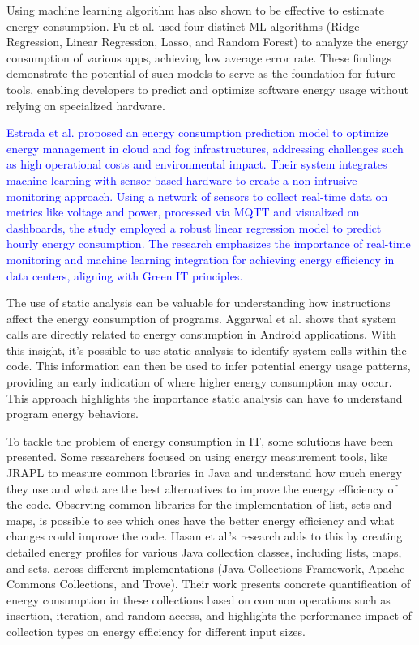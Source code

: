 \documentclass[sigplan]{acmart}
\newcommand{\wnote}[1]{\textcolor{blue}{#1}}
\begin{document}
Using machine learning algorithm has also shown to be effective to estimate energy consumption. Fu et al. \cite{8726531} used four distinct ML algorithms (Ridge Regression, Linear Regression, Lasso, and Random Forest) to analyze the energy consumption of various apps, achieving low average error rate. These findings demonstrate the potential of such models to serve as the foundation for future tools, enabling developers to predict and optimize software energy usage without relying on specialized hardware.

\wnote{Estrada et al. \cite{estrada2022learning} proposed an energy consumption prediction model to optimize energy management in cloud and fog infrastructures, addressing challenges such as high operational costs and environmental impact. Their system integrates machine learning with sensor-based hardware to create a non-intrusive monitoring approach. Using a network of sensors to collect real-time data on metrics like voltage and power, processed via MQTT and visualized on dashboards, the study employed a robust linear regression model to predict hourly energy consumption. The research emphasizes the importance of real-time monitoring and machine learning integration for achieving energy efficiency in data centers, aligning with Green IT principles.}

The use of static analysis can be valuable for understanding how instructions affect the energy consumption of programs. Aggarwal et al. \cite{aggarwal2014power} shows that system calls are directly related to energy consumption in Android applications. With this insight, it's possible to use static analysis to identify system calls within the code. This information can then be used to infer potential energy usage patterns, providing an early indication of where higher energy consumption may occur. This approach highlights the importance static analysis can have to understand program energy behaviors.

To tackle the problem of energy consumption in IT, some solutions have been presented. Some researchers focused on using energy measurement tools, like JRAPL to measure common libraries in Java and understand how much energy they use and what are the best alternatives to improve the energy efficiency of the code\cite{10.1145/2896967.2896968}. Observing common libraries for the implementation of list, sets and maps, is possible to see which ones have the better energy efficiency and what changes could improve the code.
Hasan et al.'s \cite{10.1145/2884781.2884869} research adds to this by creating detailed energy profiles for various Java collection classes, including lists, maps, and sets, across different implementations (Java Collections Framework, Apache Commons Collections, and Trove). Their work presents concrete quantification of energy consumption in these collections based on common operations such as insertion, iteration, and random access, and highlights the performance impact of collection types on energy efficiency for different input sizes.
\end{document}
